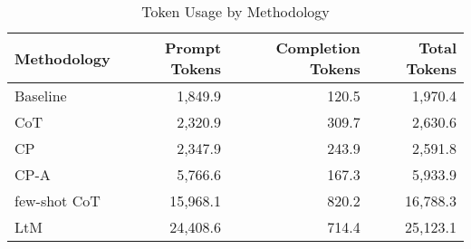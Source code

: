 \begin{table}
\caption{Token Usage by Methodology}
\label{tab:token-usage}
\begin{tabular}{lrrr}
\toprule
Methodology & Prompt Tokens & Completion Tokens & Total Tokens \\
\midrule
Baseline & 1,849.9 & 120.5 & 1,970.4 \\
CoT & 2,320.9 & 309.7 & 2,630.6 \\
CP & 2,347.9 & 243.9 & 2,591.8 \\
CP-A & 5,766.6 & 167.3 & 5,933.9 \\
few-shot CoT & 15,968.1 & 820.2 & 16,788.3 \\
LtM & 24,408.6 & 714.4 & 25,123.1 \\
\bottomrule
\end{tabular}
\end{table}
